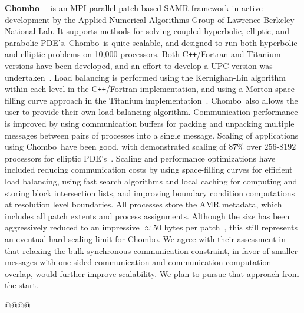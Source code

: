 \documentclass[11pt,letterpaper]{article}
\newcommand{\pp}{\texttt{++}}
\newcommand{\cpp}{C\pp}
\newcommand{\chombo}{\textsf{Chombo}}
\begin{document}
\textbf{\chombo}~\cite{wwwchombo}~\cite{CoGr09} is an MPI-parallel
patch-based SAMR framework in active development by the Applied
Numerical Algorithms Group of Lawrence Berkeley National Lab.  It
supports methods for solving coupled hyperbolic, elliptic, and
parabolic PDE's.  \chombo\ is quite scalable, and designed to run both
hyperbolic and elliptic problems on 10,000 processors.  Both
\cpp/Fortran and Titanium~\cite{wwwtitanium}~\cite{YeSe98} versions
have been developed, and an effort to develop a UPC version was
undertaken~\cite{We04}.  Load balancing is performed using the
Kernighan-Lin algorithm within each level in the \cpp/Fortran
implementation, and using a Morton space-filling curve approach in the
Titanium implementation~\cite{WeSu07}.  \chombo\ also allows the user
to provide their own load balancing algorithm.  Communication
performance is improved by using communication buffers for packing and
unpacking multiple messages between pairs of processes into a single
message.  Scaling of applications using \chombo\ have been good, with
demonstrated scaling of $87\%$ over $256$-$8192$ processors for
elliptic PDE's~\cite{CoBe07}.  Scaling and performance optimizations
have included reducing communication costs by using space-filling
curves for efficient load balancing, using fast search algorithms and
local caching for computing and storing block intersection lists, and
improving boundary condition computations at resolution level
boundaries.  All processes store the AMR metadata, which includes all
patch extents and process assignments.  Although the size has been
aggressively reduced to an impressive $\approx 50$ bytes per
patch~\cite{CoBe07}, this still represents an eventual hard scaling
limit for \chombo.  We agree with their assessment in~\cite{WeSu07}
that relaxing the bulk synchronous communication constraint, in favor
of smaller messages with one-sided communication and
communication-computation overlap, would further improve scalability.
We plan to pursue that approach from the start.

@@@@

\end{document}
